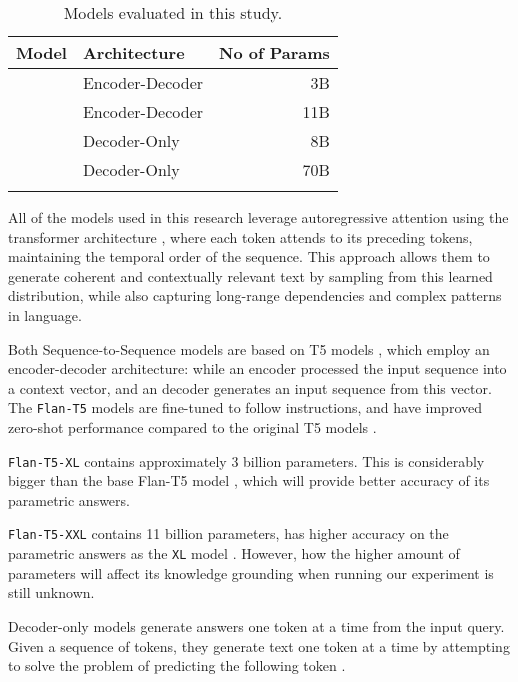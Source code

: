 \begin{table}[b]
	\centering
	\footnotesize
	\begin{tabular}{p{100pt} l r}
		\toprule
			Model             & Architecture    & No of Params \\
		\midrule
			\smallflan{}      & Encoder-Decoder & 3B          \\[5pt]
			\bigflan{}        & Encoder-Decoder & 11B         \\[5pt]
			\llamaparbox{}    & Decoder-Only    & 8B          \\[10pt]
			\bigllamaparbox{} & Decoder-Only    & 70B         \\[10pt]
		\bottomrule \addlinespace[4pt]
	\end{tabular}
	\caption{Models evaluated in this study.}
	\label{model_list}
\end{table}

All of the models used in this research leverage autoregressive attention using the transformer architecture \cite{attention_is_all_you_need}, where each token attends to its preceding tokens, maintaining the temporal order of the sequence.
This approach allows them to generate coherent and contextually relevant text by sampling from this learned distribution, while also capturing long-range dependencies and complex patterns in language.

Both Sequence-to-Sequence models are based on T5 models \cite{t5}, which employ an encoder-decoder architecture: while an encoder processed the input sequence into a context vector, and an decoder generates an input sequence from this vector.
The \texttt{Flan-T5} models are fine-tuned to follow instructions, and have improved zero-shot performance compared to the original T5 models \cite{flant5}.

\texttt{Flan-T5-XL} contains approximately 3 billion parameters.
This is considerably bigger than the base Flan-T5 model \cite{flant5}, which will provide better accuracy of its parametric answers.

\texttt{Flan-T5-XXL} contains 11 billion parameters, has higher accuracy on the parametric answers as the \texttt{XL} model \cite{flant5}.
However, how the higher amount of parameters will affect its knowledge grounding when running our experiment is still unknown.

Decoder-only models generate answers one token at a time from the input query.
Given a sequence of tokens, they generate text one token at a time by attempting to solve the problem of predicting the following token \cite{gpt}.

